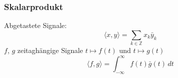 %
%
%
\begin{frame}
\frametitle{Skalarprodukt}
Abgetastete Signale:
\[
\langle x,y\rangle
=
\sum_{k\in\mathbb Z} x_k\bar{y}_k
\]
$f$, $g$ zeitaghängige Signale $t\mapsto f(t)$ und $t\mapsto g(t)$
\[
\langle f,g\rangle
=
\int_{-\infty}^\infty f(t)\bar{g}(t)\,dt
\]
\end{frame}


